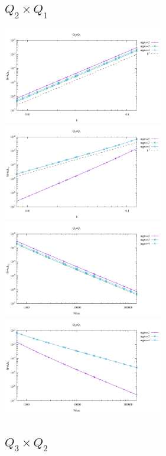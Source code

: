 \subsection*{$Q_2\times Q_1$}

\begin{center}
\includegraphics[width=7cm]{python_codes/fieldstone_120/results/Q2Q1-velocity-h.pdf}
\includegraphics[width=7cm]{python_codes/fieldstone_120/results/Q2Q1-pressure-h.pdf}\\
\includegraphics[width=7cm]{python_codes/fieldstone_120/results/Q2Q1-velocity-Nfem.pdf}
\includegraphics[width=7cm]{python_codes/fieldstone_120/results/Q2Q1-pressure-Nfem.pdf}
\end{center}

\subsection*{$Q_3\times Q_2$}

